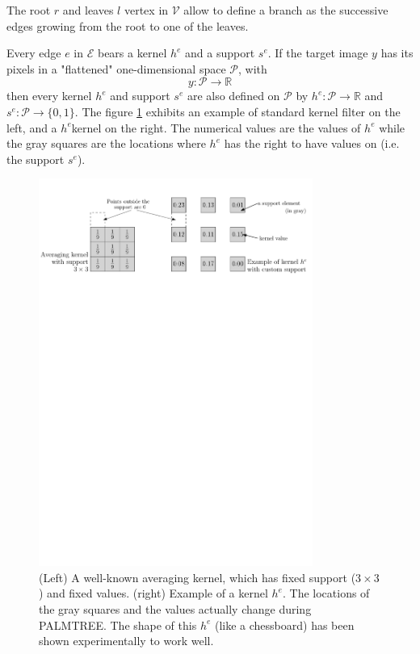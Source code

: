 The root $r$ and leaves $l$ vertex in $\mathcal{V}$ allow to define a branch as the successive edges growing from the root to one of the leaves.

Every edge $e$ in $\mathcal{E}$ bears a kernel $h^e$ and a support $s^e$. If the target image $y$ has its pixels in a "flattened" one-dimensional space $\mathcal{P}$, with
$$y : \mathcal{P} \rightarrow \mathbb{R}$$
then every kernel $h^e$ and support $s^e$ are also defined on $\mathcal{P}$ by $h^e:\mathcal{P} \rightarrow \mathbb{R}$ and $s^e:\mathcal{P} \rightarrow \{0,1\}$. The figure \ref{fig_example_kernel} exhibits an example of standard kernel filter on the left, and a $h^e$kernel on the right. The numerical values are the values of $h^e$ while the gray squares are the locations where $h^e$ has the right to have values on (i.e. the support $s^e$).

\begin{figure}[!ht]\centering
\includegraphics[width=0.8\textwidth]{figures/example-kernel.pdf}
\caption{(Left) A well-known averaging kernel, which has fixed support ($3\times3$) and fixed values. (right) Example of a kernel $h^e$. The locations of the gray squares and the values actually change during PALMTREE. The shape of this $h^e$ (like a chessboard) has been shown experimentally to work well. \label{fig_example_kernel}}
\end{figure}

